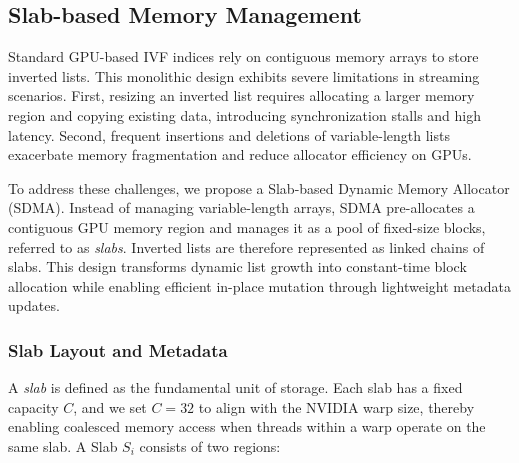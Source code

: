 \documentclass[sigconf,anonymous]{acmart}
\theoremstyle{plain}
\theoremstyle{definition}
\theoremstyle{remark}
\begin{document}

\subsection{Slab-based Memory Management}
\label{sec:slab_memory_management}

Standard GPU-based IVF indices rely on contiguous memory arrays to store inverted lists. This monolithic design exhibits severe limitations in streaming scenarios. First, resizing an inverted list requires allocating a larger memory region and copying existing data, introducing synchronization stalls and high latency. Second, frequent insertions and deletions of variable-length lists exacerbate memory fragmentation and reduce allocator efficiency on GPUs.

To address these challenges, we propose a Slab-based Dynamic Memory Allocator (SDMA). Instead of managing variable-length arrays, SDMA pre-allocates a contiguous GPU memory region and manages it as a pool of fixed-size blocks, referred to as \emph{slabs}. Inverted lists are therefore represented as linked chains of slabs. This design transforms dynamic list growth into constant-time block allocation while enabling efficient in-place mutation through lightweight metadata updates.

\subsubsection{Slab Layout and Metadata}

A \emph{slab} is defined as the fundamental unit of storage. Each slab has a fixed capacity $C$, and we set $C = 32$ to align with the NVIDIA warp size, thereby enabling coalesced memory access when threads within a warp operate on the same slab. A Slab $S_i$ consists of two regions:
\end{document}
